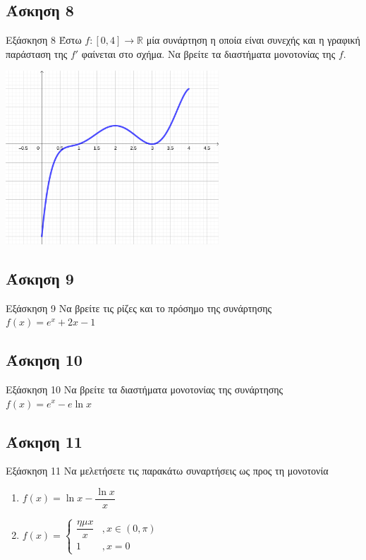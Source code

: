\documentclass[greek]{beamer}
\begin{document}
\subsection{Άσκηση 8}
\begin{frame}[label=Άσκηση8]{Εξάσκηση 8}
  Έστω $f:[0,4]\to\mathbb{R}$ μία συνάρτηση η οποία είναι συνεχής και η γραφική παράσταση της $f'$ φαίνεται στο σχήμα. Να βρείτε τα διαστήματα μονοτονίας της $f$.

  \centering
  \includegraphics[width=0.6\textwidth]{"images/2.6.2 Μονοτονία.png"}

\end{frame}

\subsection{Άσκηση 9}
\begin{frame}[label=Άσκηση9]{Εξάσκηση 9}
  Να βρείτε τις ρίζες και το πρόσημο της συνάρτησης $f(x)=e^x+2x-1$

\end{frame}

\subsection{Άσκηση 10}
\begin{frame}[label=Άσκηση10]{Εξάσκηση 10}
  Να βρείτε τα διαστήματα μονοτονίας της συνάρτησης $f(x)=e^x-e\ln x$

\end{frame}

\subsection{Άσκηση 11}
\begin{frame}[label=Άσκηση11]{Εξάσκηση 11}
  Να μελετήσετε τις παρακάτω συναρτήσεις ως προς τη μονοτονία
  \begin{enumerate}
    \item<1-> $f(x)=\ln x-\dfrac{\ln x}{x}$
    \item<2-> $f(x)=\begin{cases}
          \dfrac{ημx}{x} & ,x\in (0,\pi) \\
          1              & ,x=0
        \end{cases}$
  \end{enumerate}

\end{frame}
\end{document}
